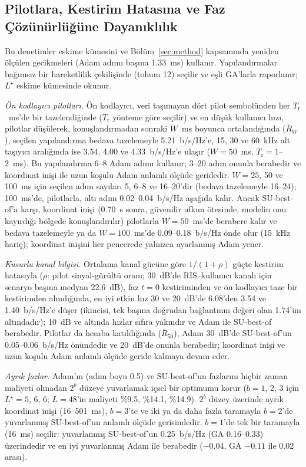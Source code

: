 \subsection{Pilotlara, Kestirim Hatasına ve Faz Çözünürlüğüne Dayanıklılık}
\label{sec:res_robust}
Bu denetimler eskime kümesini ve Bölüm~\ref{sec:method} kapsamında yeniden ölçülen gecikmeleri (Adam adımı başına 1.33~ms) kullanır. Yapılandırmalar bağımsız bir hareketlilik çekilişinde (tohum 12) seçilir ve eşli GA'larla raporlanır; $L^\star$ eskime kümesinde okunur.

\emph{Ön kodlayıcı pilotları.} Ön kodlayıcı, veri taşımayan dört pilot sembolünden her $T_{\mathrm{r}}$~ms'de bir tazelendiğinde ($T_{\mathrm{r}}$ yönteme göre seçilir) ve en düşük kullanıcı hızı, pilotlar düşülerek, konuşlandırmadan sonraki $W$~ms boyunca ortalandığında ($\bar{R}_W$), seçilen yapılandırma bedava tazelemeyle 5.21~b/s/Hz'e, 15, 30 ve 60~kHz alt taşıyıcı aralığında ise 3.54, 4.00 ve 4.33~b/s/Hz'e ulaşır ($W=50$~ms, $T_{\mathrm{r}}=1$--2~ms). Bu yapılandırma 6--8 Adam adımı kullanır; 3--20 adım onunla berabedir ve koordinat inişi ile uzun koşulu Adam anlamlı ölçüde geridedir. $W=25$, 50 ve 100~ms için seçilen adım sayıları 5, 6--8 ve 16--20'dir (bedava tazelemeyle 16--24); 100~ms'de, pilotlarla, altı adım 0.02--0.04~b/s/Hz aşağıda kalır. Ancak SU-best-of'a karşı, koordinat inişi (0.70~s sonra, güvenilir ufkun ötesinde, modelin onu kayırdığı bölgede konuşlandırılır) pilotlarla $W=50$~ms'de berabere kalır ve bedava tazelemeyle ya da $W=100$~ms'de 0.09--0.18~b/s/Hz önde olur (15~kHz hariç); koordinat inişini her pencerede yalnızca ayarlanmış Adam yener.

\emph{Kusurlu kanal bilgisi.} Ortalama kanal gücüne göre $1/(1+\rho)$ güçte kestirim hatasıyla ($\rho$: pilot sinyal-gürültü oranı; 30~dB'de RIS--kullanıcı kanalı için senaryo başına medyan 22.6~dB), faz $t=0$ kestiriminden ve ön kodlayıcı taze bir kestirimden alındığında, en iyi etkin hız 30 ve 20~dB'de 6.08'den 3.54 ve 1.40~b/s/Hz'e düşer (ikincisi, tek başına doğrudan bağlantının değeri olan 1.74'ün altındadır); 10~dB ve altında hızlar sıfıra yakındır ve Adam ile SU-best-of berabedir. Pilotlar da hesaba katıldığında ($\bar{R}_{50}$), Adam 30~dB'de SU-best-of'un 0.05--0.06~b/s/Hz önündedir ve 20~dB'de onunla berabedir; koordinat inişi ve uzun koşulu Adam anlamlı ölçüde geride kalmaya devam eder.

\emph{Ayrık fazlar.} Adam'ın (adım boyu 0.5) ve SU-best-of'un fazlarını hiçbir zaman maliyeti olmadan $2^b$ düzeye yuvarlamak içsel bir optimumu korur ($b=1$, 2, 3 için $L^\star=5$, 6, 6; $L=48$'in maliyeti \%9.5, \%14.1, \%14.9). $2^b$ düzey üzerinde ayrık koordinat inişi (16--501~ms), $b=3$'te ve iki ya da daha fazla taramayla $b=2$'de yuvarlanmış SU-best-of'un anlamlı ölçüde gerisindedir. $b=1$'de tek bir taramayla (16~ms) seçilir: yuvarlanmış SU-best-of'un 0.25~b/s/Hz (GA 0.16--0.33) üzerindedir ve en iyi yuvarlanmış Adam ile berabedir ($-0.04$, GA $-0.11$ ile 0.02 arası).
